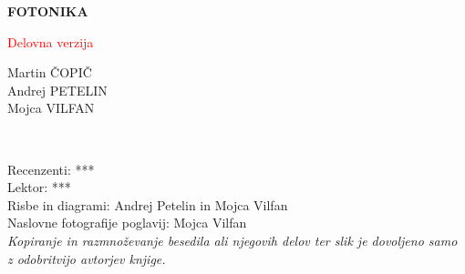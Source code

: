 \documentclass[11pt,fleqn]{book} %
\begin{document}
\let\cleardoublepage\clearpage




\begingroup
\thispagestyle{empty}
\centering
\vspace*{5cm}
\par\normalfont\fontsize{35}{35}\sffamily\selectfont
\textbf{FOTONIKA}\\
{\LARGE }\par %
\vspace*{1cm}
\vspace*{1cm}
{\LARGE \textcolor{red}{Delovna verzija}\\}\par
\vspace*{8cm}
{\Large Martin ČOPIČ \\Andrej PETELIN \\Mojca VILFAN \\}\par %
\endgroup


\newpage
~\vfill
\thispagestyle{empty}


 Recenzenti: {***}\\ %

 Lektor: {***}\\ %

 Risbe in diagrami: Andrej Petelin in Mojca Vilfan\\ %

 Naslovne fotografije poglavij: Mojca Vilfan\\ %

 \textit{\textcopyright 
Kopiranje in razmnoževanje besedila ali njegovih delov ter slik je 
dovoljeno samo z odobritvijo avtorjev knjige.} \\%
\end{document}
